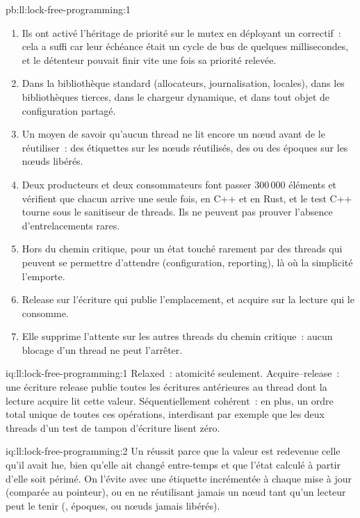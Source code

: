 \begin{solution}{pb:ll:lock-free-programming:1}
\begin{enumerate}
en attendant un journaliseur interrompu~; avec le tampon circulaire, jamais.
\item Ils ont activé l'héritage de priorité sur le mutex en déployant un correctif~: cela a suffi car leur échéance était
un cycle de bus de quelques millisecondes, et le détenteur pouvait finir vite une fois sa priorité relevée.
\item Dans la bibliothèque standard (allocateurs, journalisation, locales), dans les bibliothèques tierces, dans le chargeur dynamique, et dans tout
objet de configuration partagé.
\item Un moyen de savoir qu'aucun thread ne lit encore un nœud avant de le réutiliser~: des étiquettes sur les nœuds réutilisés, des  ou des époques sur
les nœuds libérés.
\item Deux producteurs et deux consommateurs font passer 300\,000 éléments et vérifient que chacun arrive une seule fois, en C++ et en Rust, et le test C++ tourne
sous le sanitiseur de threads. Ils ne peuvent pas prouver l'absence d'entrelacements rares.
\item Hors du chemin critique, pour un état touché rarement par des threads qui peuvent se permettre d'attendre (configuration, reporting), là où la simplicité
l'emporte.
\item Release sur l'écriture qui publie l'emplacement, et acquire sur la lecture qui le consomme.
\item Elle supprime l'attente sur les autres threads du chemin critique~: aucun blocage d'un thread ne peut l'arrêter.
\end{enumerate}
\end{solution}

\begin{solution}{iq:ll:lock-free-programming:1}
Relaxed~: atomicité seulement. Acquire--release~: une écriture release publie toutes les écritures antérieures au thread dont la lecture acquire lit
cette valeur. Séquentiellement cohérent~: en plus, un ordre total unique de toutes ces opérations, interdisant par exemple que les deux threads d'un test de
tampon d'écriture lisent zéro.
\end{solution}

\begin{solution}{iq:ll:lock-free-programming:2}
Un  réussit parce que la valeur est redevenue celle qu'il avait lue, bien qu'elle ait changé entre-temps et que l'état calculé à partir d'elle soit
périmé. On l'évite avec une étiquette incrémentée à chaque mise à jour (comparée au pointeur), ou en ne réutilisant jamais un nœud tant qu'un
lecteur peut le tenir (, époques, ou nœuds jamais libérés).
\end{solution}

